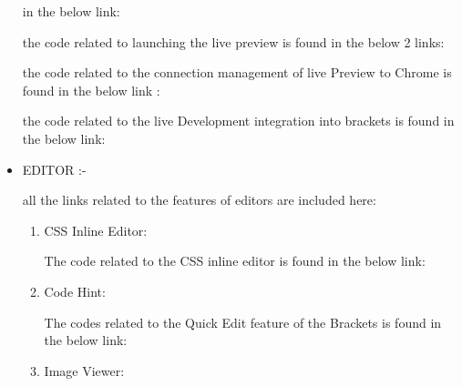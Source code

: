 \begin{itemize}
\begin{center}
in the below link: 
\end{center}
\begin{center}
the code related to launching the live preview is found in the below 2 links:   
\end{center}
\begin{center}
the code related to the connection management of live Preview to Chrome is found
in the below link : 
\end{center}
\begin{center}
the code related to the live Development integration into brackets is found in the
below link:  
\end{center}
\item EDITOR :- 
\begin{center}
all the links related to the features of editors are included here: 
\end{center}
\begin{enumerate}
\item CSS Inline Editor: 
\begin{center}
 The code related to the CSS inline editor is found in the below link:  
\end{center}
\item Code Hint: 
\begin{center} The codes related to the Quick Edit feature of the Brackets is found in the below
link: 
\end{center}
\item Image Viewer:

\end{enumerate}
\end{itemize}
